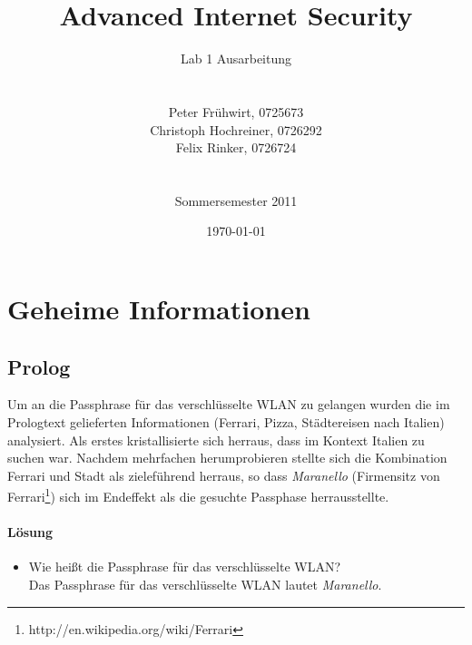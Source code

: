 \documentclass[12pt]{article}
\title{Advanced Internet Security}
\author{
	Lab 1 Ausarbeitung\\
	\\
	\\
	Peter Fr\"uhwirt, 0725673  \\
	Christoph Hochreiner, 0726292 \\
	Felix Rinker, 0726724 \\
	\\
	\\
	Sommersemester 2011
}
\date{\today}
\begin{document}
\maketitle

\newpage
\tableofcontents
\newpage
\listoffigures

\lstlistoflistings
\newpage

\section{Geheime Informationen}

\subsection{Prolog}

Um an die Passphrase für das verschlüsselte WLAN zu gelangen wurden die im Prologtext gelieferten Informationen (Ferrari, Pizza, Städtereisen nach Italien) analysiert. Als erstes kristallisierte sich herraus, dass im Kontext Italien zu suchen war. Nachdem mehrfachen herumprobieren stellte sich die Kombination Ferrari und Stadt als zieleführend herraus, so dass \textit{Maranello} (Firmensitz von Ferrari\footnote{http://en.wikipedia.org/wiki/Ferrari}) sich im Endeffekt als die gesuchte Passphase herrausstellte.

\paragraph{Lösung}
\begin{itemize}
	\item Wie heißt die Passphrase für das verschlüsselte WLAN? \\
		Das  Passphrase für das verschlüsselte WLAN lautet \textit{Maranello}.
\end{itemize}
\end{document}

